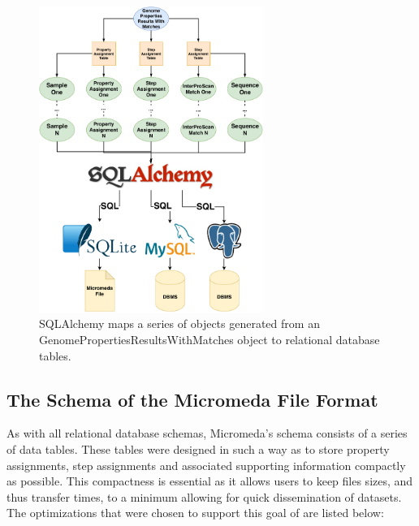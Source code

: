 \begin{figure}[!ht]
  \centering
	\includegraphics[width=0.65\textwidth]{media/SQLAlchemy.pdf}
	 \caption{SQLAlchemy maps a series of objects generated from an GenomePropertiesResultsWithMatches object to relational database tables.}
	 \label{fig:sqlalchemy}
\end{figure}

\subsection{The Schema of the Micromeda File Format}

As with all relational database schemas, Micromeda's schema consists of a series of data tables. These tables were designed in such a way as to store property assignments, step assignments and associated supporting information compactly as possible. This compactness is essential as it allows users to keep files sizes, and thus transfer times, to a minimum allowing for quick dissemination of datasets. The optimizations that were chosen to support this goal of are listed below:


